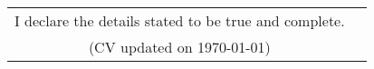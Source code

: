 \documentclass[a4paper,11pt]{article}
\makeatletter
\newcommand{\resumePOR}[3]{
\vspace{0.5mm}\item
    \begin{tabular*}{0.97\textwidth}[t]{l@{\extracolsep{\fill}}r}
        \textbf{#1}\hspace{0.3mm}#2 & \textit{\small{#3}} 
    \end{tabular*}
    \vspace{-2mm}
}
\newcommand{\resumeSubHeadingListEnd}{\end{itemize}\vspace{2mm}}
\makeatother
\begin{document}

\vfill
{
\begin{center}
\begin{tabularx}{\linewidth}{C r} %
  I declare the details stated to be true and complete. \\
  (CV updated on \today)
\end{tabularx}
\end{center}

}



\end{document}
